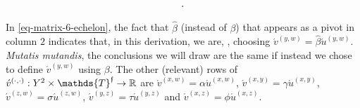 \documentclass[12pt,a4paper,twoside]{article}
\newcommand{\novel}{\mathfrak f}
\newcommand{\mbbtp}{{\mathds{T} ^ \novel }}
\newcommand{\xy}{{(x, y)}}
\newcommand{\yz}{{(y,z)}}
\newcommand{\xz}{{(x,z)}}
\newcommand{\xw}{{(x,w)}}
\newcommand{\yw}{{(y,w)}}
\newcommand{\zw}{(z,w)}
\newcommand{\dd}{{(\cdot,\cdot)}}
\begin{document}
\begin{appendices}
\begin{linenomath*}
\begin{equation}
\begin{blockarray}{ccccccc}
    \end{blockarray}.
  \end{equation}
\end{linenomath*}
In \cref{eq-matrix-6-echelon}, the fact that $\hat{\beta}$ (instead of $\beta$)
that appears as a pivot in column $2$ indicates that, in this derivation, we
are, \withoutlog, choosing $\acute{v}^{\yw} = \hat{\beta}
\acute{u}^{\yw}$. \emph{Mutatis mutandis}, the conclusions we will draw are the
same if instead we chose to define $\acute{v}^{\yw}$ using $\beta$. The other
(relevant) rows of $\acute{v}^{\dd}: Y^{2} \times \mbbtp \rightarrow \R $ are
$\acute{v}^{\xw} = \alpha \acute{u}^{\xw}$,
$\acute{v}^{\xy} = \gamma \acute{u}^{\xy}$,
$\acute{v}^{\zw}= \sigma\acute{u}^{\zw}$,
$\acute{v}^{\yz} = \tau \acute{u}^{\yz}$ and
$\acute{v}^{\xz} = \phi \acute{u}^{\xz}$.  %
\begin{figure}[t]
    \begin{center}
\end{center}
\end{figure}
\end{appendices}
\end{document}
